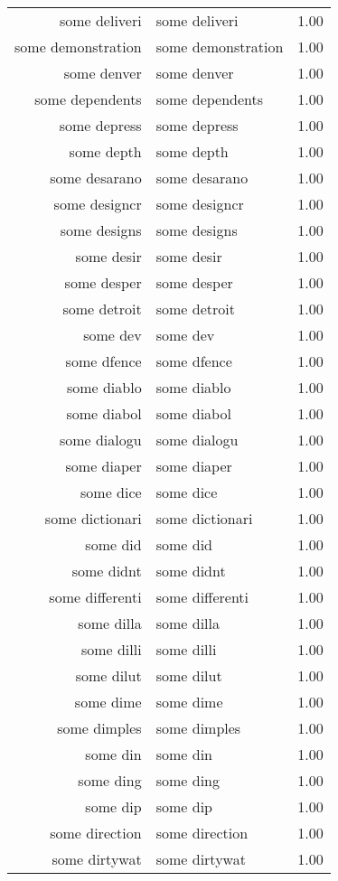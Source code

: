 \begin{table}[ht]
\begin{tabular}{rlr}
  some deliveri & some deliveri & 1.00 \\ 
  some demonstration & some demonstration & 1.00 \\ 
  some denver & some denver & 1.00 \\ 
  some dependents & some dependents & 1.00 \\ 
  some depress & some depress & 1.00 \\ 
  some depth & some depth & 1.00 \\ 
  some desarano & some desarano & 1.00 \\ 
  some designcr & some designcr & 1.00 \\ 
  some designs & some designs & 1.00 \\ 
  some desir & some desir & 1.00 \\ 
  some desper & some desper & 1.00 \\ 
  some detroit & some detroit & 1.00 \\ 
  some dev & some dev & 1.00 \\ 
  some dfence & some dfence & 1.00 \\ 
  some diablo & some diablo & 1.00 \\ 
  some diabol & some diabol & 1.00 \\ 
  some dialogu & some dialogu & 1.00 \\ 
  some diaper & some diaper & 1.00 \\ 
  some dice & some dice & 1.00 \\ 
  some dictionari & some dictionari & 1.00 \\ 
  some did & some did & 1.00 \\ 
  some didnt & some didnt & 1.00 \\ 
  some differenti & some differenti & 1.00 \\ 
  some dilla & some dilla & 1.00 \\ 
  some dilli & some dilli & 1.00 \\ 
  some dilut & some dilut & 1.00 \\ 
  some dime & some dime & 1.00 \\ 
  some dimples & some dimples & 1.00 \\ 
  some din & some din & 1.00 \\ 
  some ding & some ding & 1.00 \\ 
  some dip & some dip & 1.00 \\ 
  some direction & some direction & 1.00 \\ 
  some dirtywat & some dirtywat & 1.00 \\ 

\end{tabular}
\end{table}
